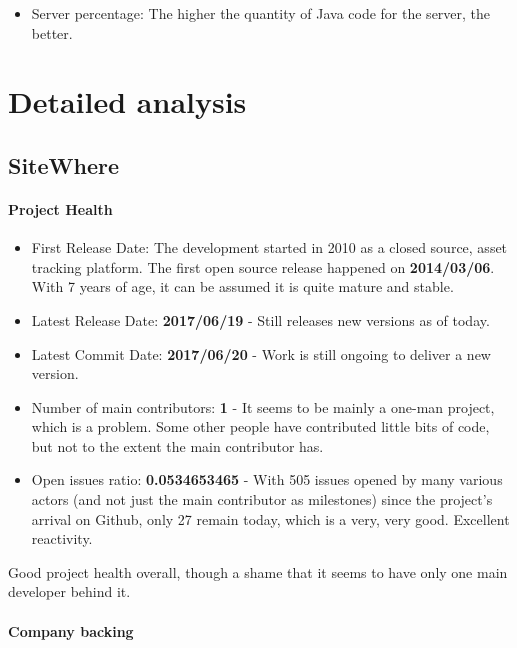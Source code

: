 \documentclass{article}
\begin{document}
\begin{itemize}
\item Server percentage: The higher the quantity of Java code for the server, the better.
\end{itemize}

\section{Detailed analysis}

\subsection{SiteWhere}

\paragraph{Project Health}

\begin{itemize}
\item First Release Date: The development started in 2010 as a closed source, asset tracking platform. The first open source release happened on \textbf{2014/03/06}. With 7 years of age, it can be assumed it is quite mature and stable.
\item Latest Release Date: \textbf{2017/06/19} - Still releases new versions as of today.
\item Latest Commit Date: \textbf{2017/06/20} - Work is still ongoing to deliver a new version.
\item Number of main contributors: \textbf{1} - It seems to be mainly a one-man project, which is a problem. Some other people have contributed little bits of code, but not to the extent the main contributor has.
\item Open issues ratio: \textbf{0.0534653465} - With 505 issues opened by many various actors (and not just the main contributor as milestones) since the project's arrival on Github, only 27 remain today, which is a very, very good. Excellent reactivity.
\end{itemize}

Good project health overall, though a shame that it seems to have only one main developer behind it.

\paragraph{Company backing}
\end{document}

